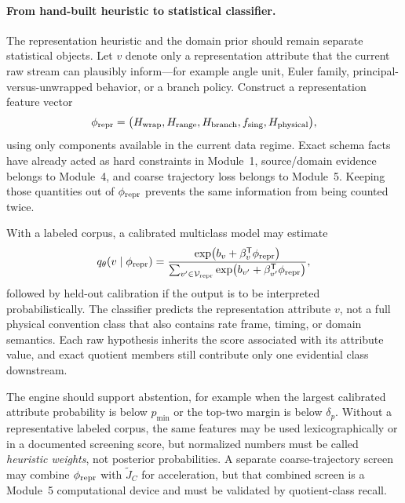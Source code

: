 \documentclass[11pt]{article}
\newcommand{\T}{\mathsf{T}}
\begin{document}
    \paragraph{From hand-built heuristic to statistical classifier.}
    The representation heuristic and the domain prior should remain separate statistical
    objects. Let $v$ denote only a representation attribute that the current raw stream can
    plausibly inform---for example angle unit, Euler family, principal-versus-unwrapped
    behavior, or a branch policy. Construct a representation feature vector
    \begin{equation}
        \phi_{\rm repr}=\bigl(
        H_{\mathrm{wrap}},
        H_{\mathrm{range}},
        H_{\mathrm{branch}},
        f_{\mathrm{sing}},
        H_{\mathrm{physical}}
        \bigr),
        \label{eq:heuristic-features}
    \end{equation}
    using only components available in the current data regime. Exact schema facts have
    already acted as hard constraints in Module~1, source/domain evidence belongs to
    Module~4, and coarse trajectory loss belongs to Module~5. Keeping those quantities out
    of $\phi_{\rm repr}$ prevents the same information from being counted twice.

    With a labeled corpus, a calibrated multiclass model may estimate
    \begin{equation}
        q_{\theta}(v\mid\phi_{\rm repr})
        =\frac{\exp\!\left(b_v+\beta_v^{\T}\phi_{\rm repr}\right)}
        {\sum_{v'\in\mathcal V_{\rm repr}}
            \exp\!\left(b_{v'}+\beta_{v'}^{\T}\phi_{\rm repr}\right)},
        \label{eq:heuristic-softmax}
    \end{equation}
    followed by held-out calibration if the output is to be interpreted probabilistically.
    The classifier predicts the representation attribute $v$, not a full physical
    convention class that also contains rate frame, timing, or domain semantics. Each raw
    hypothesis inherits the score associated with its attribute value, and exact quotient
    members still contribute only one evidential class downstream.

    The engine should support abstention, for example when the largest calibrated attribute
    probability is below $p_{\min}$ or the top-two margin is below $\delta_p$. Without a
    representative labeled corpus, the same features may be used lexicographically or in a
    documented screening score, but normalized numbers must be called \emph{heuristic
    weights}, not posterior probabilities. A separate coarse-trajectory screen may combine
    $\phi_{\rm repr}$ with $\widetilde J_C$ for acceleration, but that combined screen is a
    Module~5 computational device and must be validated by quotient-class recall.
\end{document}
